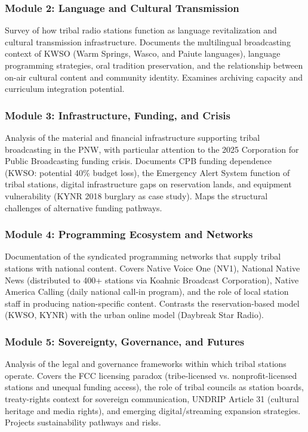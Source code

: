 \documentclass[11pt,letterpaper]{article}
\begin{document}
\subsubsection{Module 2: Language and Cultural Transmission}
Survey of how tribal radio stations function as language revitalization and cultural transmission infrastructure. Documents the multilingual broadcasting context of KWSO (Warm Springs, Wasco, and Paiute languages), language programming strategies, oral tradition preservation, and the relationship between on-air cultural content and community identity. Examines archiving capacity and curriculum integration potential.

\subsubsection{Module 3: Infrastructure, Funding, and Crisis}
Analysis of the material and financial infrastructure supporting tribal broadcasting in the PNW, with particular attention to the 2025 Corporation for Public Broadcasting funding crisis. Documents CPB funding dependence (KWSO: potential 40\% budget loss), the Emergency Alert System function of tribal stations, digital infrastructure gaps on reservation lands, and equipment vulnerability (KYNR 2018 burglary as case study). Maps the structural challenges of alternative funding pathways.

\subsubsection{Module 4: Programming Ecosystem and Networks}
Documentation of the syndicated programming networks that supply tribal stations with national content. Covers Native Voice One (NV1), National Native News (distributed to 400+ stations via Koahnic Broadcast Corporation), Native America Calling (daily national call-in program), and the role of local station staff in producing nation-specific content. Contrasts the reservation-based model (KWSO, KYNR) with the urban online model (Daybreak Star Radio).

\subsubsection{Module 5: Sovereignty, Governance, and Futures}
Analysis of the legal and governance frameworks within which tribal stations operate. Covers the FCC licensing paradox (tribe-licensed vs. nonprofit-licensed stations and unequal funding access), the role of tribal councils as station boards, treaty-rights context for sovereign communication, UNDRIP Article 31 (cultural heritage and media rights), and emerging digital/streaming expansion strategies. Projects sustainability pathways and risks.
\end{document}
